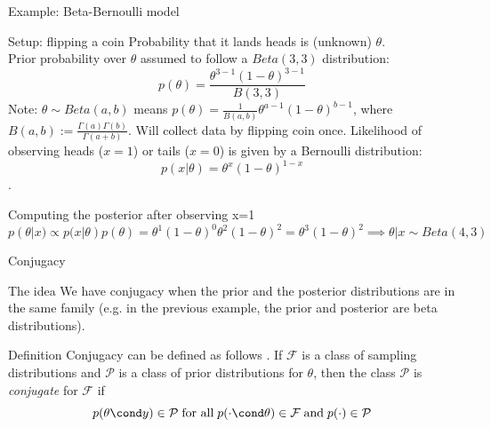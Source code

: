 \documentclass[10pt]{beamer}
\begin{document}
\begin{frame}{Example: Beta-Bernoulli model}

\begin{sblock}{Setup: flipping a coin}
Probability that it lands heads is (unknown) $\theta$. \\
Prior probability over $\theta$ assumed to follow a $Beta(3,3)$ distribution:
$$ p(\theta) = \frac{\theta^{3-1}(1-\theta)^{3-1}}{B(3,3)}$$
{\tiny Note: $\theta \sim Beta(a, b)$ means $p(\theta) = \frac{1}{B(a,b)}\theta^{a-1}(1-\theta)^{b-1}$, where $B(a,b):= \frac{\Gamma(a) \Gamma(b)}{\Gamma(a+b)}.$}
\vfill 
Will collect data by flipping coin once. Likelihood of observing heads ($x=1$) or tails ($x=0$) is given by a Bernoulli distribution:
$$p(x | \theta) = \theta^x(1-\theta)^{1-x} $$.
\end{sblock}
\begin{sblock}{Computing the posterior after observing x=1}
$$p(\theta| x) \propto p(x | \theta) p(\theta) = \theta^1(1-\theta)^{0}  \theta^{2}(1-\theta)^{2}  = \theta^3 (1-\theta)^2 \implies \theta | x \sim Beta(4,3)$$
\end{sblock}

\end{frame}



\begin{frame}{Conjugacy}

\begin{sblock}{The idea}
We have conjugacy when the prior and the posterior distributions are in the same family (e.g. in the previous example, the prior and posterior are beta distributions).
\end{sblock}

\begin{sblock}{Definition}
Conjugacy can be defined as follows \cite{gelman2013bayesian}. If $\mathcal{F}$ is a class of sampling distributions and $\mathcal{P}$ is a class of prior distributions for $\theta$, then the class $\mathcal{P}$ is \textit{conjugate} for $\mathcal{F}$ if
\[  p(\theta \cond y ) \in \mathcal{P} \; \text{for all} \; p(\cdot \cond \theta) \in \mathcal{F} \; \text{and} \; p(\cdot) \in \mathcal{P} \]
\end{sblock}

\end{frame}


\end{document}
